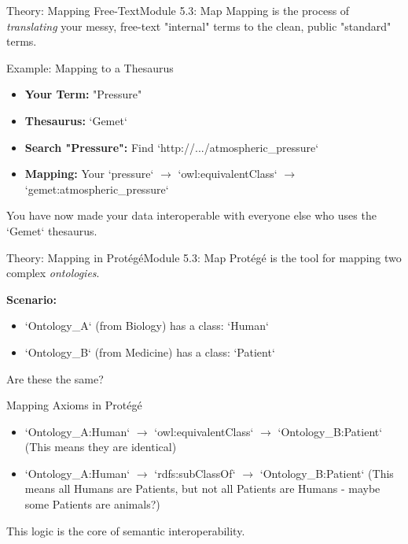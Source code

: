 \begin{frame}{Theory: Mapping Free-Text}{Module 5.3: Map}
    Mapping is the process of \emph{translating} your messy, free-text "internal" terms to the clean, public "standard" terms.
    
    \begin{block}{Example: Mapping to a Thesaurus}
        \begin{itemize}
            \item \textbf{Your Term:} "Pressure"
            \pause
            \item \textbf{Thesaurus:} `Gemet`
            \item \textbf{Search "Pressure":} Find `http://.../atmospheric\_pressure`
            \pause
            \item \textbf{Mapping:} Your `pressure` $\rightarrow$ `owl:equivalentClass` $\rightarrow$ `gemet:atmospheric\_pressure`
        \end{itemize}
    \end{block}
    You have now made your data interoperable with everyone else who uses the `Gemet` thesaurus.
\end{frame}

\begin{frame}{Theory: Mapping in Protégé}{Module 5.3: Map}
    Protégé is the tool for mapping two complex \emph{ontologies}.
    
    \textbf{Scenario:}
    \begin{itemize}
        \item `Ontology\_A` (from Biology) has a class: `Human`
        \item `Ontology\_B` (from Medicine) has a class: `Patient`
    \end{itemize}
    \pause
    Are these the same?
    \pause
    \begin{block}{Mapping Axioms in Protégé}
        \begin{itemize}
            \item `Ontology\_A:Human` $\rightarrow$ `owl:equivalentClass` $\rightarrow$ `Ontology\_B:Patient`
            (This means they are identical)
            \pause
            \item `Ontology\_A:Human` $\rightarrow$ `rdfs:subClassOf` $\rightarrow$ `Ontology\_B:Patient`
            (This means all Humans are Patients, but not all Patients are Humans - maybe some Patients are animals?)
        \end{itemize}
    \end{block}
    This logic is the core of semantic interoperability.
\end{frame}

